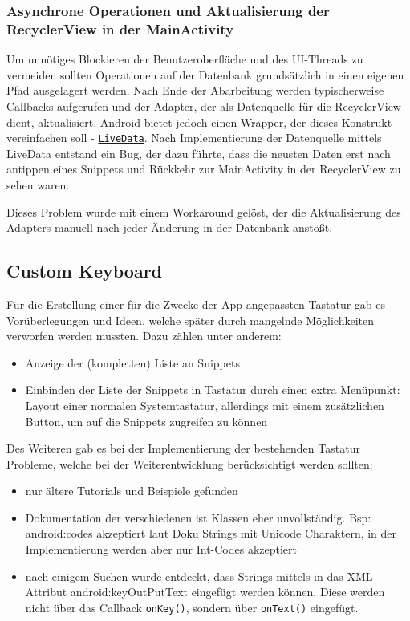 \documentclass[11pt]{article}
\begin{document}
	\subsubsection{Asynchrone Operationen und Aktualisierung der RecyclerView in der MainActivity}
	Um unnötiges Blockieren der Benutzeroberfläche und des UI-Threads zu vermeiden sollten Operationen auf der Datenbank grundsätzlich in einen eigenen Pfad ausgelagert werden. Nach Ende der Abarbeitung werden typischerweise Callbacks aufgerufen und der Adapter, der als Datenquelle für die RecyclerView dient, aktualisiert. Android bietet jedoch einen Wrapper, der dieses Konstrukt vereinfachen soll - \href{https://developer.android.com/topic/libraries/architecture/livedata}{\texttt{LiveData}}. \newline
	Nach Implementierung der Datenquelle mittels LiveData entstand ein Bug, der dazu führte, dass die neusten Daten erst nach antippen eines Snippets und Rückkehr zur MainActivity in der RecyclerView zu sehen waren. \newline
	
	\noindent Dieses Problem wurde mit einem Workaround gelöst, der die Aktualisierung des Adapters manuell nach jeder Änderung in der Datenbank anstößt.
	
	\subsection{Custom Keyboard}
	Für die Erstellung einer für die Zwecke der App angepassten Tastatur gab es Vorüberlegungen und Ideen, welche später durch mangelnde Möglichkeiten verworfen werden mussten. Dazu zählen unter anderem: 
	\begin{itemize}
		\item Anzeige der (kompletten) Liste an Snippets 
		\item Einbinden der Liste der Snippets in Tastatur durch einen extra Menüpunkt: Layout einer normalen Systemtastatur, allerdings mit einem zusätzlichen Button, um auf die Snippets zugreifen zu können
	\end{itemize}
	
	\noindent Des Weiteren gab es bei der Implementierung der bestehenden Tastatur Probleme, welche bei der Weiterentwicklung berücksichtigt werden sollten:
	\begin{itemize}
		\item nur ältere Tutorials und Beispiele gefunden
		\item Dokumentation der verschiedenen ist Klassen eher unvollständig. Bsp: android:codes akzeptiert laut Doku Strings mit Unicode Charaktern, in der Implementierung werden aber nur Int-Codes akzeptiert
		\item nach einigem Suchen wurde entdeckt, dass Strings mittels in das XML-Attribut android:keyOutPutText eingefügt werden können. Diese werden nicht über das Callback \texttt{onKey()}, sondern über \texttt{onText()} eingefügt.
	\end{itemize}
\end{document}
